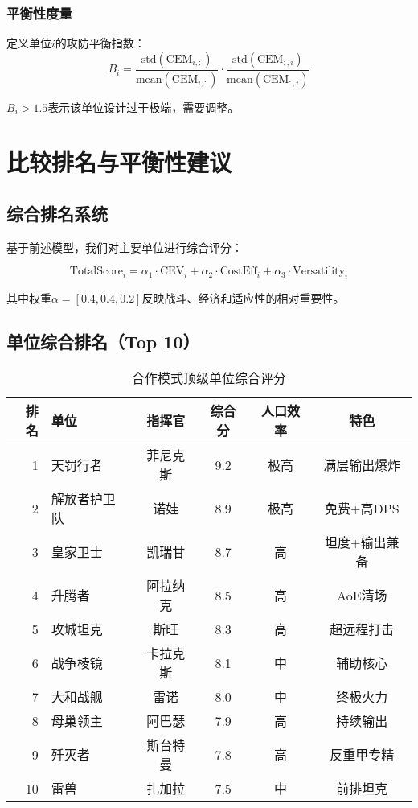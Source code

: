 \documentclass[a4paper,12pt]{article}
\begin{document}
\subsubsection{平衡性度量}
定义单位$i$的攻防平衡指数：
\begin{equation}
B_i = \frac{\text{std}(\text{CEM}_{i,:})}{\text{mean}(\text{CEM}_{i,:})} \cdot \frac{\text{std}(\text{CEM}_{:,i})}{\text{mean}(\text{CEM}_{:,i})}
\end{equation}

$B_i > 1.5$表示该单位设计过于极端，需要调整。

\section{比较排名与平衡性建议}

\subsection{综合排名系统}
基于前述模型，我们对主要单位进行综合评分：

\begin{equation}
\text{TotalScore}_i = \alpha_1 \cdot \text{CEV}_i + \alpha_2 \cdot \text{CostEff}_i + \alpha_3 \cdot \text{Versatility}_i
\end{equation}

其中权重$\alpha = [0.4, 0.4, 0.2]$反映战斗、经济和适应性的相对重要性。

\subsection{单位综合排名（Top 10）}
\begin{table}[h]
\centering
\caption{合作模式顶级单位综合评分}
\begin{tabular}{rlcccc}
\toprule
\textbf{排名} & \textbf{单位} & \textbf{指挥官} & \textbf{综合分} & \textbf{人口效率} & \textbf{特色} \\
\midrule
1 & 天罚行者 & 菲尼克斯 & 9.2 & 极高 & 满层输出爆炸 \\
2 & 解放者护卫队 & 诺娃 & 8.9 & 极高 & 免费+高DPS \\
3 & 皇家卫士 & 凯瑞甘 & 8.7 & 高 & 坦度+输出兼备 \\
4 & 升腾者 & 阿拉纳克 & 8.5 & 高 & AoE清场 \\
5 & 攻城坦克 & 斯旺 & 8.3 & 高 & 超远程打击 \\
6 & 战争棱镜 & 卡拉克斯 & 8.1 & 中 & 辅助核心 \\
7 & 大和战舰 & 雷诺 & 8.0 & 中 & 终极火力 \\
8 & 母巢领主 & 阿巴瑟 & 7.9 & 高 & 持续输出 \\
9 & 歼灭者 & 斯台特曼 & 7.8 & 高 & 反重甲专精 \\
10 & 雷兽 & 扎加拉 & 7.5 & 中 & 前排坦克 \\
\bottomrule
\end{tabular}
\end{table}
\end{document}
